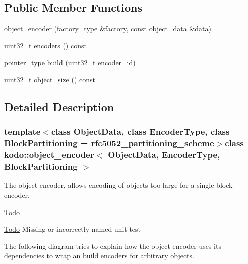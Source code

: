 \subsection*{Public Member Functions}
\begin{DoxyCompactItemize}
\item 
\hyperlink{classkodo_1_1object__encoder_af1b84a7bf33be73afe6717cdc32776ae}{object\-\_\-encoder} (\hyperlink{classkodo_1_1object__encoder_ad9e399452c48178bb156e39fedb72fa3}{factory\-\_\-type} \&factory, const \hyperlink{classkodo_1_1object__encoder_a05600877e34f3720c919743f43e6505d}{object\-\_\-data} \&data)
\item 
uint32\-\_\-t \hyperlink{classkodo_1_1object__encoder_ac2f8a6ec7d8b39a164b6ebd5b7ee5adf}{encoders} () const 
\item 
\hyperlink{classkodo_1_1object__encoder_afc4b239a485fcf3d53baf2774fea093b}{pointer\-\_\-type} \hyperlink{classkodo_1_1object__encoder_ac8a70f90a949737f121e278c63beef7c}{build} (uint32\-\_\-t encoder\-\_\-id)
\item 
uint32\-\_\-t \hyperlink{classkodo_1_1object__encoder_a42ef903d76699d9842d209fe446b4544}{object\-\_\-size} () const 
\end{DoxyCompactItemize}


\subsection{Detailed Description}
\subsubsection*{template$<$class Object\-Data, class Encoder\-Type, class Block\-Partitioning = rfc5052\-\_\-partitioning\-\_\-scheme$>$class kodo\-::object\-\_\-encoder$<$ Object\-Data, Encoder\-Type, Block\-Partitioning $>$}

The object encoder, allows encoding of objects too large for a single block encoder. 

\begin{DoxyRefDesc}{Todo}
\item[\hyperlink{todo__todo000030}{Todo}]Missing or incorrectly named unit test \end{DoxyRefDesc}
The following diagram tries to explain how the object encoder uses its dependencies to wrap an build encoders for arbitrary objects.


